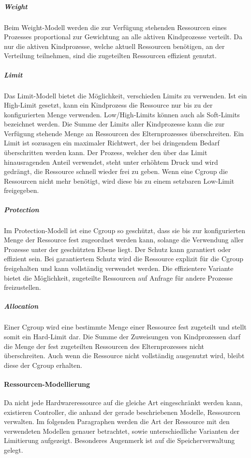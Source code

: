 \subparagraph{Weight}
Beim Weight-Modell werden die zur Verfügung stehenden Ressourcen eines Prozesses proportional zur Gewichtung an alle aktiven Kindprozesse verteilt. Da nur die aktiven Kindprozesse, welche aktuell Ressourcen benötigen, an der Verteilung teilnehmen, sind die zugeteilten Ressourcen effizient genutzt. 

\subparagraph{Limit}
Das Limit-Modell bietet die Möglichkeit, verschieden Limits zu verwenden. Ist ein High-Limit gesetzt, kann ein Kindprozess die Ressource nur bis zu der konfigurierten Menge verwenden. Low/High-Limits können auch als Soft-Limits bezeichnet werden. Die Summe der Limits aller Kindprozesse kann die zur Verfügung stehende Menge an Ressourcen des Elternprozesses überschreiten. Ein Limit ist sozusagen ein maximaler Richtwert, der bei dringendem Bedarf überschritten werden kann. Der Prozess, welcher den über das Limit hinausragenden Anteil verwendet, steht unter erhöhtem Druck und wird gedrängt, die Ressource schnell wieder frei zu geben. Wenn eine Cgroup die Ressourcen nicht mehr benötigt, wird diese bis zu einem setzbaren Low-Limit freigegeben.


\subparagraph{Protection}
Im Protection-Modell ist eine Cgroup so geschützt, dass sie bis zur konfigurierten Menge der Ressource fest zugeordnet werden kann, solange die Verwendung aller Prozesse unter der geschützten Ebene liegt. Der Schutz kann garantiert oder effizient sein. Bei garantiertem Schutz wird die Ressource explizit für die Cgroup freigehalten und kann vollständig verwendet werden. Die effizientere Variante bietet die Möglichkeit, zugeteilte Ressourcen auf Anfrage für andere Prozesse freizustellen.


\subparagraph{Allocation}
Einer Cgroup wird eine bestimmte Menge einer Ressource fest zugeteilt und stellt somit ein Hard-Limit dar. Die Summe der Zuweisungen von Kindprozessen darf die Menge der fest zugeteilten Ressourcen des Elternprozesses nicht überschreiten. Auch wenn die Ressource nicht vollständig ausgenutzt wird, bleibt diese der Cgroup erhalten. 


\paragraph{Ressourcen-Modellierung}
Da nicht jede Hardwareressource auf die gleiche Art eingeschränkt werden kann, existieren Controller, die anhand der gerade beschriebenen Modelle, Ressourcen verwalten. Im folgenden Paragraphen werden die Art der Ressource mit den verwendeten Modellen genauer betrachtet, sowie unterschiedliche Varianten der Limitierung aufgezeigt. Besonderes Augenmerk ist auf die Speicherverwaltung gelegt.

